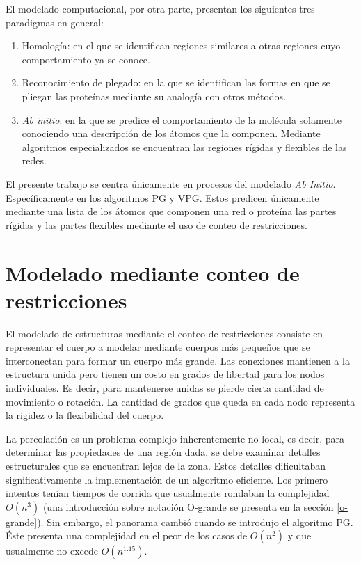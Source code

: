 El modelado computacional, por otra parte, presentan los siguientes tres paradigmas en general:\parencite{Ahmed2013}

\begin{enumerate}
\item Homología: en el que se identifican regiones similares a otras regiones cuyo comportamiento ya se conoce.
\item Reconocimiento de plegado: en la que se identifican las formas en que se pliegan las proteínas mediante su analogía con otros métodos.
\item \emph{Ab initio}: en la que se predice el comportamiento de la molécula solamente conociendo una descripción de los átomos que la componen. Mediante algoritmos especializados se encuentran las regiones rígidas y flexibles de las redes.
\end{enumerate}

El presente trabajo se centra únicamente en procesos del modelado \emph{Ab Initio}. Específicamente en los algoritmos PG y VPG. Estos predicen únicamente mediante una lista de los átomos que componen una red o proteína las partes rígidas y las partes flexibles mediante el uso de conteo de restricciones.

\section{Modelado mediante conteo de restricciones}
El modelado de estructuras mediante el conteo de restricciones consiste en representar el cuerpo a modelar mediante cuerpos más pequeños que se interconectan para formar un cuerpo más grande. Las conexiones mantienen a la estructura unida pero tienen un costo en grados de libertad para los nodos individuales. Es decir, para mantenerse unidas se pierde cierta cantidad de movimiento o rotación. La cantidad de grados que queda en cada nodo representa la rigidez o la flexibilidad del cuerpo.

La percolación es un problema complejo inherentemente no local, es decir, para determinar las propiedades de una región dada, se debe examinar detalles estructurales que se encuentran lejos de la zona. Estos detalles dificultaban significativamente la implementación de un algoritmo eficiente. Los primero intentos tenían tiempos de corrida que usualmente rondaban la complejidad $O(n^3)$ (una introducción sobre notación O-grande se presenta en la sección \ref{o-grande}). Sin embargo, el panorama cambió cuando se introdujo el algoritmo PG. Éste presenta una complejidad en el peor de los casos de $O(n^2)$ y que usualmente no excede $O(n^{1.15})$\parencite{Jacobs1997}.


